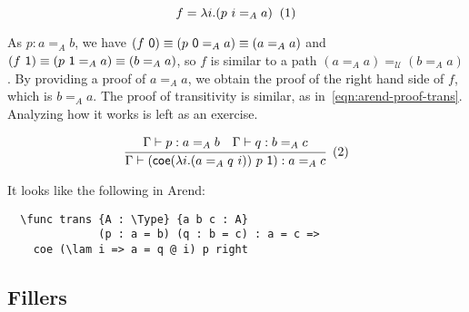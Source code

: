 \[
  f = \lambda i. (p\ i =_A a)
  \xtag
\]

As $p : a =_A b$, we have
$(f \ \textsf 0) \equiv (p \ \textsf 0 =_A a) \equiv (a =_A a)$ and
$(f \ \textsf 1) \equiv (p \ \textsf 1 =_A a) \equiv (b =_A a)$,
so $f$ is similar to a path $(a =_A a) =_{\mathcal U} (b =_A a)$.
By providing a proof  of $a =_A a$,
we obtain the proof of the right hand side of $f$, which is $b =_A a$.
The proof of transitivity is similar, as in~\ref{eqn:arend-proof-trans}.
Analyzing how it works is left as an exercise.

\[
  \cfrac{
    \Gamma \vdash p : a =_A b
    \quad
    \Gamma \vdash q : b =_A c
  }{
    \Gamma \vdash (\textsf{coe}
    (\lambda i. (a =_A q\ i)) \ p \ \textsf 1)
    : a =_A c
  }
  \xtag \label{eqn:arend-proof-trans}
\]

It looks like the following in Arend:

\begin{verbatim}
  \func trans {A : \Type} {a b c : A}
              (p : a = b) (q : b = c) : a = c =>
    coe (\lam i => a = q @ i) p right
\end{verbatim}

\subsection{Fillers}
\label{subsec:fill}

\TODO
